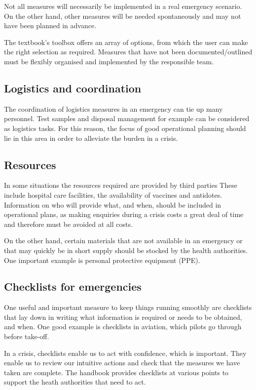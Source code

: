 \documentclass{article}
\begin{document}
Not all measures will necessarily be implemented in a real emergency scenario. On the other hand, other measures will be needed spontaneously and may not have been planned in advance.


The textbook's toolbox offers an array of options, from which the user can make the right selection as required. Measures that have not been documented/outlined must be flexibly organised and implemented by the responsible team.


\subsection{Logistics and coordination}\label{H7435934}



The coordination of logistics measures in an emergency can tie up many personnel. Test samples and disposal management for example can be considered as logistics tasks. For this reason, the focus of good operational planning should lie in this area in order to alleviate the burden in a crisis.


\subsection{Resources}\label{H4751184}



In some situations the resources required are provided by third parties These include hospital care facilities, the availability of vaccines and antidotes. Information on who will provide what, and when, should be included in operational plans, as making enquiries during a crisis costs a great deal of time and therefore must be avoided at all costs.


On the other hand, certain materials that are not available in an emergency or that may quickly be in short supply should be stocked by the health authorities. One important example is personal protective equipment (PPE).


\subsection{Checklists for emergencies}\label{H6589258}



One useful and important measure to keep things running smoothly are checklists that lay down in writing what information is required or needs to be obtained, and when. One good example is checklists in aviation, which pilots go through before take-off.


In a crisis, checklists enable us to act with confidence, which is important. They enable us to review our intuitive actions and check that the measures we have taken are complete. The handbook provides checklists at various points to support the heath authorities that need to act.
\end{document}
